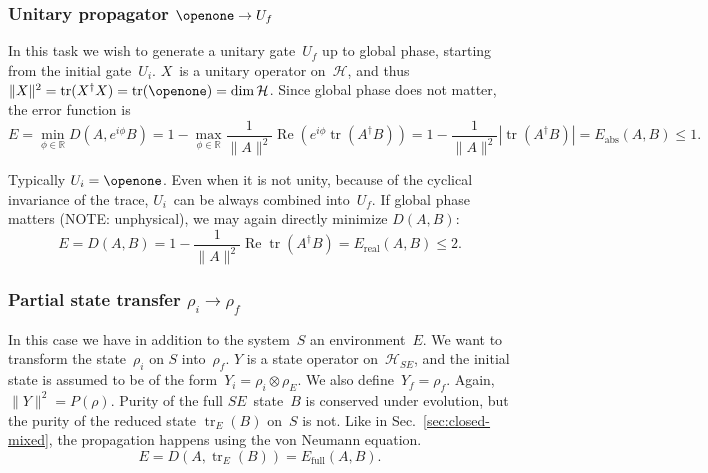 \documentclass[aps, pra, a4paper, longbibliography, superscriptaddress]{revtex4-1}
\newcommand{\I}{\openone}
\newcommand{\be}{\begin{equation}}
\newcommand{\ee}{\end{equation}}
\newcommand{\R}{{\mathbb R}}  %
\newcommand{\hilb}[1]{\mathcal{#1}}
\DeclareMathOperator{\tr}{tr}
\DeclareMathOperator{\re}{Re}
\newcommand{\vecop}[1]{\widehat{#1}}
\begin{document}
\subsubsection{Unitary propagator $\I \to U_f$}
\label{sec:closed-u}
In this task we wish to generate a unitary gate~$U_f$ up to global
phase, starting from the initial gate~$U_i$.
$X$~is a unitary operator on~$\hilb{H}$, and
thus $\|X\|^2 = \tr(X^\dagger X) = \tr(\I) = \dim \hilb{H}$.
Since global phase does not matter, the error function is
\be
E
= \min_{\phi \in \R} D(A, e^{i \phi} B)
= 1 -\max_{\phi \in \R} \frac{1}{\|A\|^2} \re \left( e^{i \phi} \tr(A^\dagger B)\right)
= 1 -\frac{1}{\|A\|^2}|\tr(A^\dagger B)|
= E_\text{abs}(A, B) \le 1.
\ee
\begin{comment}
We can also get rid of phase by explicitly lifting the problem into
Liouville space (see Eq.~\eqref{eq:L-unitary}),
$X = \vecop{V} = V^* \otimes V$,
and then minimize the operator distance~$D(A, B)$.
Using Eq.~\eqref{eq:hat-product}, the norm squared is 
\be
\|X\|^2 = \|\vecop{V}\|^2
= \tr(\vecop{V}^\dagger \vecop{V})
= |\tr(V^\dagger V)|^2
= |\tr(\I)|^2
= (\dim \hilb{H})^2
= \|V\|^4.
\ee
This is constant, so we may maximize the fidelity instead:
\be
f(A, B)
= \frac{1}{\|A\|^2} \re \tr \left(A^\dagger B \right)
= \frac{1}{\|V_f\|^4} \left| \tr \left(V_f^\dagger V_n \right) \right|^2.
\ee
It clearly obeys $0 \le f(A, B) \le 1$.
Much like in
Sec.~\ref{sec:closed-pure},
the problem simplifies back into Hilbert space, and we may equivalently
choose~$X = V$.
\end{comment}

Typically $U_i = \I$.
Even when it is not unity, because of the cyclical invariance of the trace, $U_i$~can be always combined into~$U_f$.
If global phase matters (NOTE: unphysical), we may again directly minimize
$D(A, B)$:
\be
E
= D(A, B)
= 1 -\frac{1}{\|A\|^2} \re \tr(A^\dagger B)
= E_\text{real}(A, B) \le 2.
\ee




\subsubsection{Partial state transfer $\rho_i \to \rho_f$}

In this case we have in addition to the system~$S$ an environment~$E$.
We want to transform the state~$\rho_i$ on $S$ into~$\rho_f$.
$Y$ is a state operator on~$\hilb{H}_{SE}$, and
the initial state is assumed to be of the
form~$Y_i = \rho_i \otimes \rho_E$.
We also define~$Y_f = \rho_f$.
Again, $\|Y\|^2 = P(\rho)$.
Purity of the full $SE$~state~$B$ is conserved under evolution,
but the purity of the reduced state $\tr_E(B)$ on~$S$ is not.
Like in Sec.~\ref{sec:closed-mixed},
the propagation happens using the von Neumann equation.
\be
E
= D(A, \tr_E(B))
= E_\text{full}(A, B).
\ee
\end{document}
